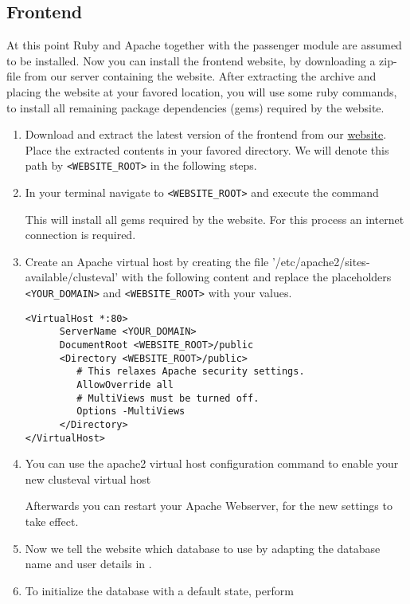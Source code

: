 		 \subsection{Frontend}\label{install_frontend}
		 At this point Ruby and Apache together with the passenger module are assumed to be installed. Now you can install the frontend website, by downloading a zip-file from our server containing the \clusteval website. After extracting the archive and placing the website at your favored location, you will use some ruby commands, to install all remaining package dependencies (gems) required by the website.
		 \begin{enumerate}
		 	\item Download and extract the latest version of the frontend from our \href{\urlfrontend}{website}. Place the extracted contents in your favored directory. We will denote this path by \texttt{<WEBSITE\_ROOT>} in the following steps.
		 	\item In your terminal navigate to \texttt{<WEBSITE\_ROOT>} and execute the command 
		 	

		 	
		 	This will install all gems required by the website. For this process an internet connection is required.
		 	\item Create an Apache virtual host by creating the file '/etc/apache2/sites-available/clusteval' with the following content and replace the placeholders \texttt{<YOUR\_DOMAIN>} and \texttt{<WEBSITE\_ROOT>} with your values.
	\begin{verbatim}
<VirtualHost *:80>
      ServerName <YOUR_DOMAIN>
      DocumentRoot <WEBSITE_ROOT>/public
      <Directory <WEBSITE_ROOT>/public>
         # This relaxes Apache security settings.
         AllowOverride all
         # MultiViews must be turned off.
         Options -MultiViews
      </Directory>
</VirtualHost>
	\end{verbatim}
		 	\item You can use the apache2 virtual host configuration command to enable your new clusteval virtual host
		 	
		 	
		 	Afterwards you can restart your Apache Webserver, for the new settings to take effect.
		 	
		 	
		 	\item Now we tell the website which database to use by adapting the database name and user details in .
		 	
		 	\item To initialize the database with a default state, perform
		 	
		 \end{enumerate}
